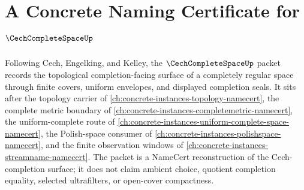 \chapter{A Concrete Naming Certificate for $\CechCompleteSpaceUp$}
\label{ch:concrete-instances-cech-complete-space-namecert}

Following Cech, Engelking, and Kelley, the $\CechCompleteSpaceUp$ packet records the topological completion-facing surface of a completely regular space through finite covers, uniform envelopes, and displayed completion seals. It sits after the topology carrier of \autoref{ch:concrete-instances-topology-namecert}, the complete metric boundary of \autoref{ch:concrete-instances-completemetric-namecert}, the uniform-complete route of \autoref{ch:concrete-instances-uniform-complete-space-namecert}, the Polish-space consumer of \autoref{ch:concrete-instances-polishspace-namecert}, and the finite observation windows of \autoref{ch:concrete-instances-streamname-namecert}. The packet is a NameCert reconstruction of the Cech-completion surface; it does not claim ambient choice, quotient completion equality, selected ultrafilters, or open-cover compactness.


